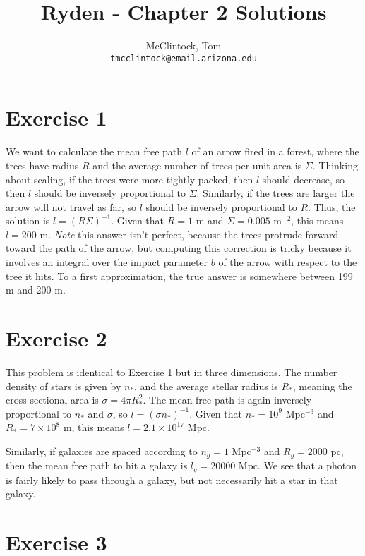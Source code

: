 \documentclass[12pt,a4paper]{article}
\author{
  McClintock, Tom\\
  \texttt{tmcclintock@email.arizona.edu}
}
\title{Ryden - Chapter 2 Solutions}
\begin{document}
\maketitle

\section{Exercise 1}
\label{sec:ex1}

We want to calculate the mean free path $l$ of an arrow fired in a forest, where the trees have radius $R$ and the average number of trees per unit area is $\Sigma$. Thinking about scaling, if the trees were more tightly packed, then $l$ should decrease, so then $l$ should be inversely proportional to $\Sigma$. Similarly, if the trees are larger the arrow will not travel as far, so $l$ should be inversely proportional to $R$. Thus, the solution is $l=(R\Sigma)^{-1}$. Given that $R=1$ m and $\Sigma = 0.005$ m$^{-2}$, this means $l=200$ m. {\it Note} this answer isn't perfect, because the trees protrude forward toward the path of the arrow, but computing this correction is tricky because it involves an integral over the impact parameter $b$ of the arrow with respect to the tree it hits. To a first approximation, the true answer is somewhere between 199 m and 200 m.

\section{Exercise 2}
\label{sec:ex2}

This problem is identical to Exercise 1 but in three dimensions. The number density of stars is given by $n_*$, and the average stellar radius is $R_*$, meaning the cross-sectional area is $\sigma = 4\pi R_*^2$. The mean free path is again inversely proportional to $n_*$ and $\sigma$, so $l=(\sigma n_*)^{-1}$. Given that $n_* = 10^9$ Mpc$^{-3}$ and $R_* = 7\times 10^8$ m, this means $l = 2.1\times 10^{17}$ Mpc.

Similarly, if galaxies are spaced according to $n_g= 1$ Mpc$^{-3}$ and $R_g=2000$ pc, then the mean free path to hit a galaxy is $l_g = 20000$ Mpc. We see that a photon is fairly likely to pass through a galaxy, but not necessarily hit a star in that galaxy.

\section{Exercise 3}
\label{sec:ex3}
\end{document}
